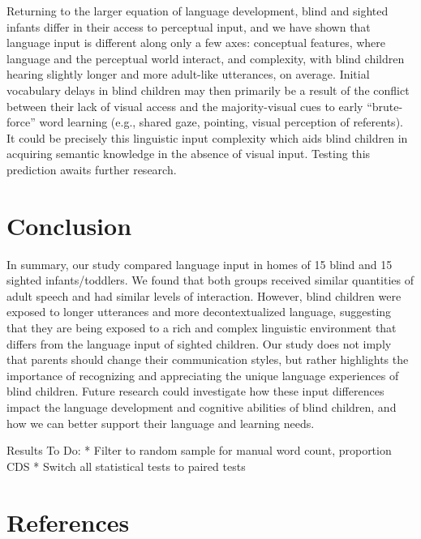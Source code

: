 \documentclass[
  man,floatsintext]{apa6}
\begin{document}
Returning to the larger equation of language development, blind and sighted infants differ in their access to perceptual input, and we have shown that language input is different along only a few axes: conceptual features, where language and the perceptual world interact, and complexity, with blind children hearing slightly longer and more adult-like utterances, on average. Initial vocabulary delays in blind children may then primarily be a result of the conflict between their lack of visual access and the majority-visual cues to early ``brute-force'' word learning (e.g., shared gaze, pointing, visual perception of referents). It could be precisely this linguistic input complexity which aids blind children in acquiring semantic knowledge in the absence of visual input. Testing this prediction awaits further research.

\hypertarget{conclusion}{%
\section{Conclusion}\label{conclusion}}

In summary, our study compared language input in homes of 15 blind and 15 sighted infants/toddlers. We found that both groups received similar quantities of adult speech and had similar levels of interaction. However, blind children were exposed to longer utterances and more decontextualized language, suggesting that they are being exposed to a rich and complex linguistic environment that differs from the language input of sighted children. Our study does not imply that parents should change their communication styles, but rather highlights the importance of recognizing and appreciating the unique language experiences of blind children. Future research could investigate how these input differences impact the language development and cognitive abilities of blind children, and how we can better support their language and learning needs.

\pagebreak

Results To Do:
* Filter to random sample for manual word count, proportion CDS
* Switch all statistical tests to paired tests

\hypertarget{references}{%
\section*{References}\label{references}}
\end{document}
